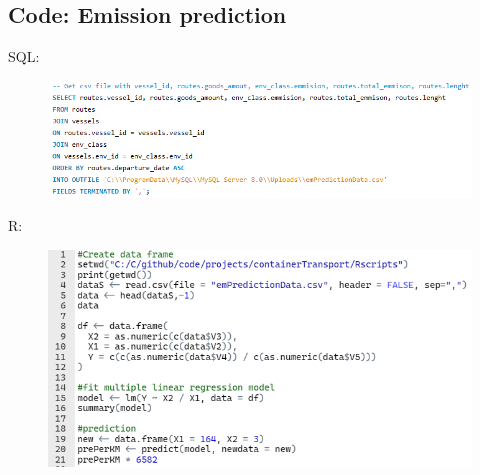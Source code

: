 \documentclass[a4paper]{article}
\begin{document}
\subsection{Code: Emission prediction}
\label{appendix:emmisionRcode2}
SQL: 
\begin{figure} [H]
    \flushleft
    \includegraphics[width=1\linewidth]{code/SQLtoR.PNG}
    \label{fig:SQLtoR}
\end{figure} 
{\flushleft R:}
\begin{figure} [H]
    \flushleft
    \includegraphics[width=1\linewidth]{code/Rpredict.PNG}
    \label{fig:Rpredict}
\end{figure}
\end{document}
